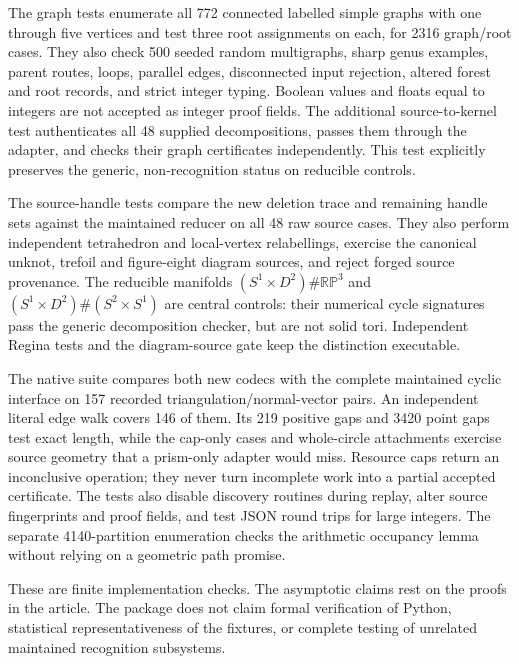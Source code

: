 

The graph tests enumerate all 772 connected labelled simple graphs with
one through five vertices and test three root assignments on each, for
2316 graph/root cases.  They also check 500 seeded random multigraphs,
sharp genus examples, parent routes, loops, parallel edges, disconnected
input rejection, altered forest and root records, and strict integer
typing.  Boolean values and floats equal to integers are not accepted as
integer proof fields.  The additional source-to-kernel test authenticates
all 48 supplied decompositions, passes them through the adapter, and
checks their graph certificates independently.  This test explicitly
preserves the generic, non-recognition status on reducible controls.

The source-handle tests compare the new deletion trace and remaining
handle sets against the maintained reducer on all 48 raw source cases.
They also perform independent tetrahedron and local-vertex relabellings,
exercise the canonical unknot, trefoil and figure-eight diagram sources,
and reject forged source provenance.  The reducible manifolds
$(S^1\times D^2)\#\mathbb{RP}^3$ and
$(S^1\times D^2)\#(S^2\times S^1)$ are central controls: their numerical
cycle signatures pass the generic decomposition checker, but are not
solid tori.  Independent Regina tests and the diagram-source gate keep
the distinction executable.

The native suite compares both new codecs with the complete maintained
cyclic interface on 157 recorded triangulation/normal-vector pairs.
An independent literal edge walk covers 146 of them.  Its 219 positive
gaps and 3420 point gaps test exact length, while the cap-only cases and
whole-circle attachments exercise source geometry that a prism-only
adapter would miss.  Resource caps return an inconclusive operation;
they never turn incomplete work into a partial accepted certificate.
The tests also disable discovery routines during replay, alter source
fingerprints and proof fields, and test JSON round trips for large
integers.  The separate 4140-partition enumeration checks the arithmetic
occupancy lemma without relying on a geometric path promise.

These are finite implementation checks.  The asymptotic claims rest on
the proofs in the article.  The package does not claim formal verification
of Python, statistical representativeness of the fixtures, or complete
testing of unrelated maintained recognition subsystems.

